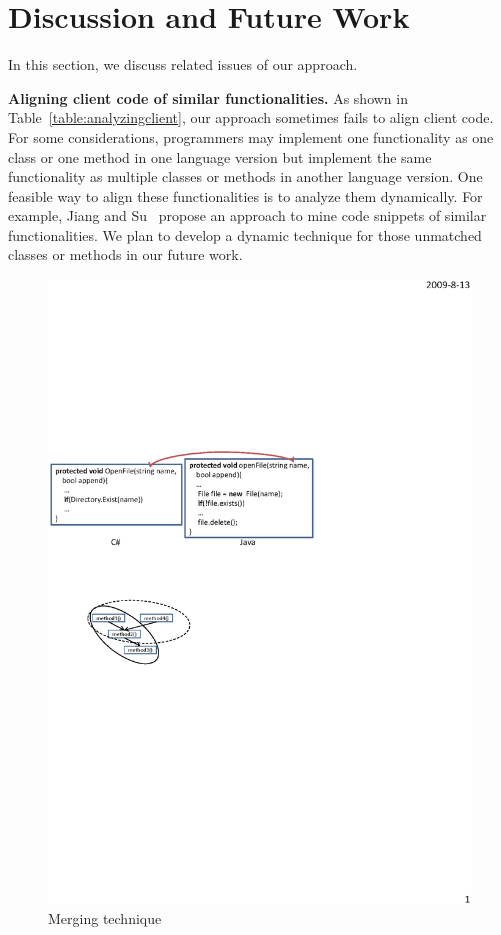 \section{Discussion and Future Work}
\label{sec:discuss} In this section, we discuss related issues of
our approach.

\textbf{Aligning client code of similar functionalities.} As shown
in Table~\ref{table:analyzingclient}, our approach sometimes fails
to align client code. For some considerations, programmers may
implement one functionality as one class or one method in one
language version but implement the same functionality as multiple
classes or methods in another language version. One feasible way to
align these functionalities is to analyze them dynamically. For
example, Jiang and Su~\cite{jiang2009automatic} propose an approach
to mine code snippets of similar functionalities. We plan to develop
a dynamic technique for those unmatched classes or methods in our
future work.
\begin{figure}[t]
\centering
\includegraphics[scale=1,clip]{figure/n2n.eps}\vspace*{-3ex}
 \caption{Merging technique}\vspace*{-3.5ex}
 \label{fig:n2n}
\end{figure}

